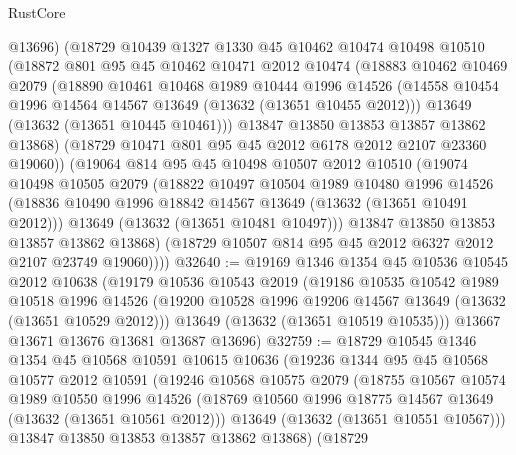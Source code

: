 \begin{lexlean}{RustCore}
\begin{coremodule}
        @13696)
      (@18729
        @10439
        @1327
        @1330
        @45
        @10462
        @10474
        @10498
        @10510
        (@18872
          @801
          @95
          @45
          @10462
          @10471
          @2012
          @10474
          (@18883
            @10462
            @10469
            @2079
            (@18890
              @10461
              @10468
              @1989
              @10444
              @1996
              @14526
              (@14558 @10454 @1996 @14564 @14567 @13649 (@13632 (@13651 @10455 @2012)))
              @13649
              (@13632 (@13651 @10445 @10461)))
            @13847
            @13850
            @13853
            @13857
            @13862
            @13868)
          (@18729 @10471 @801 @95 @45 @2012 @6178 @2012 @2107 @23360 @19060))
        (@19064
          @814
          @95
          @45
          @10498
          @10507
          @2012
          @10510
          (@19074
            @10498
            @10505
            @2079
            (@18822
              @10497
              @10504
              @1989
              @10480
              @1996
              @14526
              (@18836 @10490 @1996 @18842 @14567 @13649 (@13632 (@13651 @10491 @2012)))
              @13649
              (@13632 (@13651 @10481 @10497)))
            @13847
            @13850
            @13853
            @13857
            @13862
            @13868)
          (@18729 @10507 @814 @95 @45 @2012 @6327 @2012 @2107 @23749 @19060))))
@32640 := @19169
    @1346
    @1354
    @45
    @10536
    @10545
    @2012
    @10638
    (@19179
      @10536
      @10543
      @2019
      (@19186
        @10535
        @10542
        @1989
        @10518
        @1996
        @14526
        (@19200 @10528 @1996 @19206 @14567 @13649 (@13632 (@13651 @10529 @2012)))
        @13649
        (@13632 (@13651 @10519 @10535)))
      @13667
      @13671
      @13676
      @13681
      @13687
      @13696)
@32759 := @18729
    @10545
    @1346
    @1354
    @45
    @10568
    @10591
    @10615
    @10636
    (@19236
      @1344
      @95
      @45
      @10568
      @10577
      @2012
      @10591
      (@19246
        @10568
        @10575
        @2079
        (@18755
          @10567
          @10574
          @1989
          @10550
          @1996
          @14526
          (@18769 @10560 @1996 @18775 @14567 @13649 (@13632 (@13651 @10561 @2012)))
          @13649
          (@13632 (@13651 @10551 @10567)))
        @13847
        @13850
        @13853
        @13857
        @13862
        @13868)
      (@18729

\end{coremodule}
\end{lexlean}
